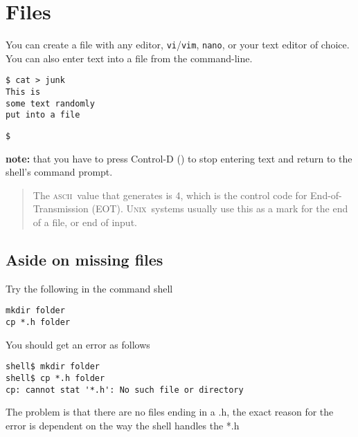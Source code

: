 \documentclass[12pt,a4paper]{article}
\newcommand{\unix}{\textsc{Unix}}
\newcommand{\ascii}{\textsc{ascii}}
\begin{document}
\section{Files}
You can create a file with any editor, \verb'vi'/\verb'vim', \verb'nano', or
your text editor of choice.  You can also enter text into a file from the 
command-line.
\begin{code}
\begin{verbatim}
$ cat > junk
This is
some text randomly
put into a file
\end{verbatim}
\vspace{-1em}
\vspace{-1em}
\begin{verbatim}
$
\end{verbatim}
\end{code}
\noindent\textbf{note:} that you have to press Control-D ()
to stop entering text and return to the shell's command prompt.
\begin{quote}
	The \ascii\ value that   generates is 4, which is the control
	code for End-of-Transmission (EOT).  \unix\ systems usually use this as a 
	mark for the end of a file, or end of input.
\end{quote}


\subsection{Aside on missing files}
Try the following in the command shell
\begin{terminal}
\begin{verbatim}
mkdir folder
cp *.h folder
\end{verbatim}
\end{terminal}
You should get an error as follows
\begin{terminal}
\begin{verbatim}
shell$ mkdir folder
shell$ cp *.h folder
cp: cannot stat '*.h': No such file or directory
\end{verbatim}
\end{terminal}
The problem is that there are no files ending in a \textsf{.h}, the exact
reason for the error is dependent on the way the shell handles the \textsf{*.h}
\end{document}
